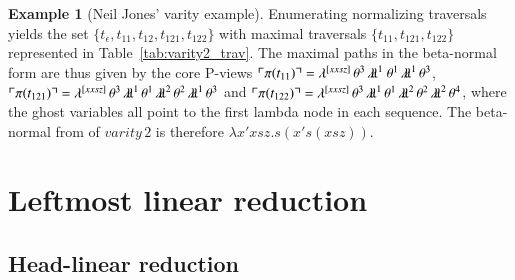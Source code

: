 \documentclass{elsarticle}
\theoremstyle{plain}
\theoremstyle{definition}
\newtheorem{example}{Example}[section]
\newcommand{\ghostlmd}{{\lambda\!\!\lambda}}
\newcommand{\ghostvar}{\theta}
\def\coresymbol{\pi} %
\newcommand{\core}[1]{\coresymbol(#1)} %
\begin{document}
\begin{example}[Neil Jones' varity example]
Enumerating normalizing traversals yields the set $\{t_\epsilon, t_{11}, t_{12}, t_{121}, t_{122} \}$ with maximal traversals $\{ t_{11}, t_{121}, t_{122} \}$ represented in Table~\ref{tab:varity2_trav}.
The maximal paths in the beta-normal form are thus given by the core P-views
$\pview{\core{t_{11}}} =
        \lambda^{[x x s z]} \,\ghostvar^{3}\,\ghostlmd^{1}\
        \ghostvar^{1}\,\ghostlmd^{1}\,\ghostvar^{3}
$,
$\pview{\core{t_{121}}} =
        \lambda^{[x x s z]} \,\ghostvar^{3}\,\ghostlmd^{1}\,\ghostvar^{1}\,\ghostlmd^{2}\,\ghostvar^{2}\,\ghostlmd^{1}\,\ghostvar^{3}$
and
$\pview{\core{t_{122}}} =
    \lambda^{[x x s z]} \,\ghostvar^{3}\,\ghostlmd^{1}\,\ghostvar^{1}\,\ghostlmd^{2}\,\ghostvar^{2}\,\ghostlmd^{2}\,\ghostvar^{4}$,
where the ghost variables all point to the first lambda node in each sequence.
The beta-normal from of $varity\, 2$ is therefore $\lambda x' x s z . s (x' s (x s z))$.
\end{example}


\section{Leftmost linear reduction}
\label{sec:leftmostlinearred}


\subsection{Head-linear reduction}
\end{document}
